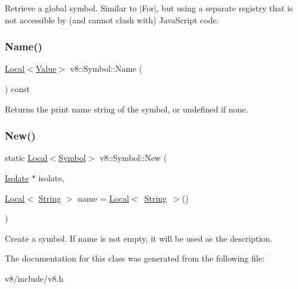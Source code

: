Retrieve a global symbol. Similar to $\vert$\+For$\vert$, but using a separate registry that is not accessible by (and cannot clash with) Java\+Script code. \mbox{\label{classv8_1_1Symbol_a8ed6ef9221bc26fbe978bfc5e33f31b4}} 
\subsubsection{\texorpdfstring{Name()}{Name()}}
{\footnotesize\ttfamily \mbox{\hyperlink{classv8_1_1Local}{Local}}$<$\mbox{\hyperlink{classv8_1_1Value}{Value}}$>$ v8\+::\+Symbol\+::\+Name (\begin{DoxyParamCaption}{ }\end{DoxyParamCaption}) const}

Returns the print name string of the symbol, or undefined if none. \mbox{\label{classv8_1_1Symbol_add1f6084974464105b56595d34c14ab9}} 
\subsubsection{\texorpdfstring{New()}{New()}}
{\footnotesize\ttfamily static \mbox{\hyperlink{classv8_1_1Local}{Local}}$<$\mbox{\hyperlink{classv8_1_1Symbol}{Symbol}}$>$ v8\+::\+Symbol\+::\+New (\begin{DoxyParamCaption}\item[{\mbox{\hyperlink{classv8_1_1Isolate}{Isolate}} $\ast$}]{isolate,  }\item[{\mbox{\hyperlink{classv8_1_1Local}{Local}}$<$ \mbox{\hyperlink{classv8_1_1String}{String}} $>$}]{name = {\ttfamily \mbox{\hyperlink{classv8_1_1Local}{Local}}$<$~\mbox{\hyperlink{classv8_1_1String}{String}}~$>$()} }\end{DoxyParamCaption})\hspace{0.3cm}{\ttfamily [static]}}

Create a symbol. If name is not empty, it will be used as the description. 

The documentation for this class was generated from the following file\+:\begin{DoxyCompactItemize}
\item 
v8/include/v8.\+h\end{DoxyCompactItemize}
